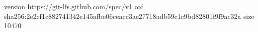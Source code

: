 version https://git-lfs.github.com/spec/v1
oid sha256:2e2cf1c882741342e145afbe06ceacc3ae27718adb59c1c9bd82801f9f9ac32a
size 10470
